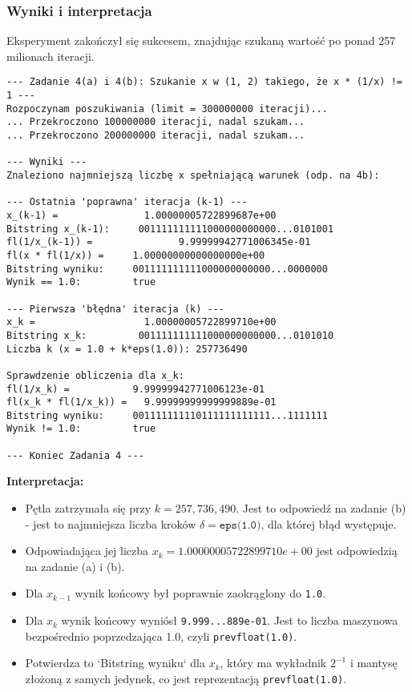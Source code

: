 \documentclass[11pt, a4paper]{article}
\begin{document}
\subsubsection{Wyniki i interpretacja}
Eksperyment zakończył się sukcesem, znajdując szukaną wartość po ponad 257 milionach iteracji.
\begin{verbatim}
--- Zadanie 4(a) i 4(b): Szukanie x w (1, 2) takiego, że x * (1/x) != 1 ---
Rozpoczynam poszukiwania (limit = 300000000 iteracji)...
... Przekroczono 100000000 iteracji, nadal szukam...
... Przekroczono 200000000 iteracji, nadal szukam...

--- Wyniki ---
Znaleziono najmniejszą liczbę x spełniającą warunek (odp. na 4b):

--- Ostatnia 'poprawna' iteracja (k-1) ---
x_(k-1) =               1.00000005722899687e+00
Bitstring x_(k-1):     001111111111000000000000...0101001
fl(1/x_(k-1)) =               9.99999942771006345e-01
fl(x * fl(1/x)) =     1.00000000000000000e+00
Bitstring wyniku:     001111111111000000000000...0000000
Wynik == 1.0:         true

--- Pierwsza 'błędna' iteracja (k) ---
x_k =                   1.00000005722899710e+00
Bitstring x_k:         001111111111000000000000...0101010
Liczba k (x = 1.0 + k*eps(1.0)): 257736490

Sprawdzenie obliczenia dla x_k:
fl(1/x_k) =           9.99999942771006123e-01
fl(x_k * fl(1/x_k)) =   9.99999999999999889e-01
Bitstring wyniku:     001111111110111111111111...1111111
Wynik != 1.0:         true

--- Koniec Zadania 4 ---
\end{verbatim}

\noindent \textbf{Interpretacja:}
\begin{itemize}
    \item Pętla zatrzymała się przy $k = 257,736,490$. Jest to odpowiedź na zadanie (b) - jest to najmniejsza liczba kroków $\delta = \texttt{eps(1.0)}$, dla której błąd występuje.
    \item Odpowiadająca jej liczba $x_k = 1.00000005722899710e+00$ jest odpowiedzią na zadanie (a) i (b).
    \item Dla $x_{k-1}$ wynik końcowy był poprawnie zaokrąglony do \texttt{1.0}.
    \item Dla $x_k$ wynik końcowy wyniósł \texttt{9.999...889e-01}. Jest to liczba maszynowa bezpośrednio poprzedzająca 1.0, czyli \texttt{prevfloat(1.0)}.
    \item Potwierdza to `Bitstring wyniku` dla $x_k$, który ma wykładnik $2^{-1}$ i mantysę złożoną z samych jedynek, co jest reprezentacją \texttt{prevfloat(1.0)}.
\end{itemize}
\end{document}
